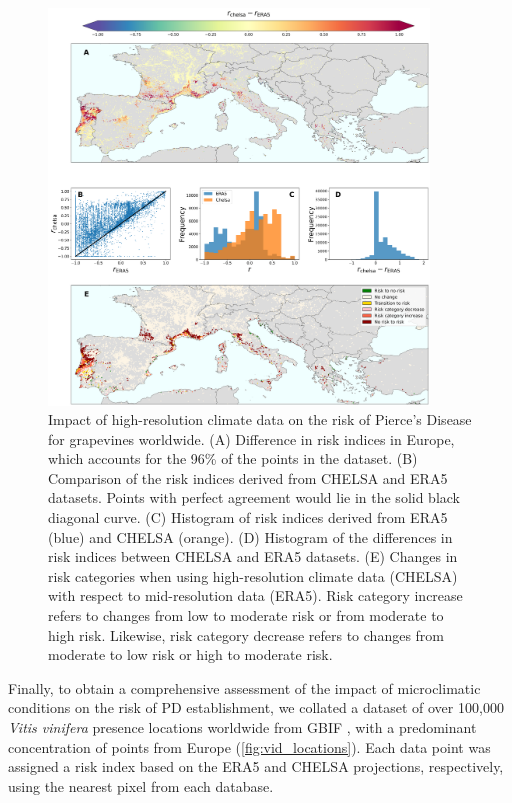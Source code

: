 \begin{figure}[H]
    \centering

    \includegraphics[width=0.9\textwidth]{Figures/risk_difference_vineyards.pdf}
    \caption{Impact of high-resolution climate data on the risk of Pierce's
        Disease for grapevines worldwide. (A) Difference in risk indices in
        Europe,
        which accounts for the 96\% of the points in the dataset. (B)
        Comparison of the
        risk indices derived from CHELSA and ERA5 datasets. Points with perfect
        agreement would lie in the solid black diagonal curve. (C) Histogram of
        risk
        indices derived from ERA5 (blue) and CHELSA (orange). (D) Histogram of
        the
        differences in risk indices between CHELSA and ERA5 datasets. (E)
        Changes in
        risk categories when using high-resolution climate data (CHELSA) with
        respect
        to mid-resolution data (ERA5). Risk category increase refers to changes
        from
        low to moderate risk or from moderate to high risk. Likewise, risk
        category
        decrease refers to changes from moderate to low risk or high to
        moderate risk.}
    \label{fig:risk_dif_vid}
\end{figure}

Finally, to obtain a comprehensive assessment of the impact of
microclimatic conditions on the risk of PD establishment, we collated a dataset
of over 100,000 \textit {Vitis vinifera} presence locations worldwide from GBIF
\cite{GBIF}, with a predominant concentration of points from Europe
(\cref{fig:vid_locations}). Each data point was assigned a risk index
based on
the ERA5 and CHELSA projections, respectively, using the nearest pixel from
each database.

